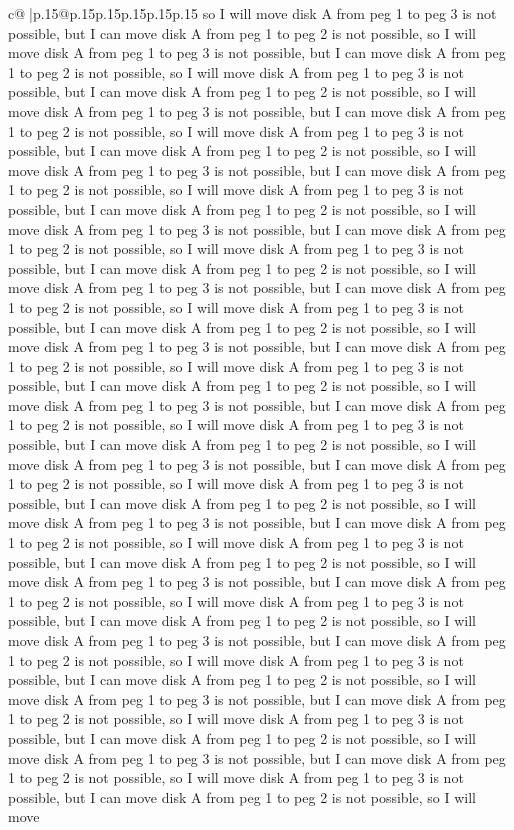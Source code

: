 \documentclass{article}
\begin{document}
{\begin{supertabular}{c@{$\;$}|p{.15\linewidth}@{}p{.15\linewidth}p{.15\linewidth}p{.15\linewidth}p{.15\linewidth}p{.15\linewidth}}
{{{so I will move disk A from peg 1 to peg 3 is not possible, but I can move disk A from peg 1 to peg 2 is not possible, so I will move disk A from peg 1 to peg 3 is not possible, but I can move disk A from peg 1 to peg 2 is not possible, so I will move disk A from peg 1 to peg 3 is not possible, but I can move disk A from peg 1 to peg 2 is not possible, so I will move disk A from peg 1 to peg 3 is not possible, but I can move disk A from peg 1 to peg 2 is not possible, so I will move disk A from peg 1 to peg 3 is not possible, but I can move disk A from peg 1 to peg 2 is not possible, so I will move disk A from peg 1 to peg 3 is not possible, but I can move disk A from peg 1 to peg 2 is not possible, so I will move disk A from peg 1 to peg 3 is not possible, but I can move disk A from peg 1 to peg 2 is not possible, so I will move disk A from peg 1 to peg 3 is not possible, but I can move disk A from peg 1 to peg 2 is not possible, so I will move disk A from peg 1 to peg 3 is not possible, but I can move disk A from peg 1 to peg 2 is not possible, so I will move disk A from peg 1 to peg 3 is not possible, but I can move disk A from peg 1 to peg 2 is not possible, so I will move disk A from peg 1 to peg 3 is not possible, but I can move disk A from peg 1 to peg 2 is not possible, so I will move disk A from peg 1 to peg 3 is not possible, but I can move disk A from peg 1 to peg 2 is not possible, so I will move disk A from peg 1 to peg 3 is not possible, but I can move disk A from peg 1 to peg 2 is not possible, so I will move disk A from peg 1 to peg 3 is not possible, but I can move disk A from peg 1 to peg 2 is not possible, so I will move disk A from peg 1 to peg 3 is not possible, but I can move disk A from peg 1 to peg 2 is not possible, so I will move disk A from peg 1 to peg 3 is not possible, but I can move disk A from peg 1 to peg 2 is not possible, so I will move disk A from peg 1 to peg 3 is not possible, but I can move disk A from peg 1 to peg 2 is not possible, so I will move disk A from peg 1 to peg 3 is not possible, but I can move disk A from peg 1 to peg 2 is not possible, so I will move disk A from peg 1 to peg 3 is not possible, but I can move disk A from peg 1 to peg 2 is not possible, so I will move disk A from peg 1 to peg 3 is not possible, but I can move disk A from peg 1 to peg 2 is not possible, so I will move disk A from peg 1 to peg 3 is not possible, but I can move disk A from peg 1 to peg 2 is not possible, so I will move disk A from peg 1 to peg 3 is not possible, but I can move disk A from peg 1 to peg 2 is not possible, so I will move disk A from peg 1 to peg 3 is not possible, but I can move disk A from peg 1 to peg 2 is not possible, so I will move disk A from peg 1 to peg 3 is not possible, but I can move disk A from peg 1 to peg 2 is not possible, so I will move disk A from peg 1 to peg 3 is not possible, but I can move disk A from peg 1 to peg 2 is not possible, so I will move disk A from peg 1 to peg 3 is not possible, but I can move disk A from peg 1 to peg 2 is not possible, so I will move disk A from peg 1 to peg 3 is not possible, but I can move disk A from peg 1 to peg 2 is not possible, so I will move }}}
\end{supertabular}}
\end{document}
